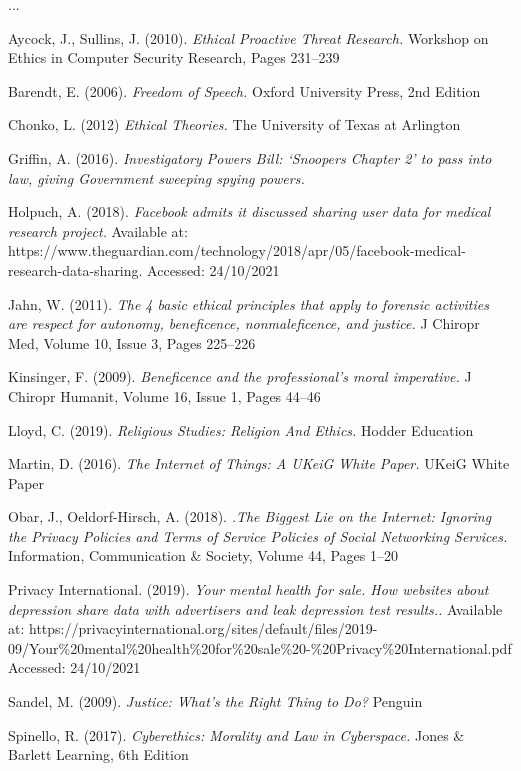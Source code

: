 \documentclass[11pt, english]{article}
\begin{document}
...

\newpage

\renewcommand\refname{Bibliography}

\begin{thebibliography}{9}

	\bibitem{}
		Aycock, J., Sullins, J. (2010).
                \textsl{Ethical Proactive Threat Research.}
		Workshop on Ethics in Computer Security Research, Pages 231--239

	\bibitem{}
		Barendt, E. (2006).
                \textsl{Freedom of Speech.}
		Oxford University Press, 2nd Edition 

        \bibitem{}
		Chonko, L. (2012)
                \textsl{Ethical Theories.}
		The University of Texas at Arlington

	\bibitem{}
		Griffin, A. (2016).
                \textsl{Investigatory Powers Bill: `Snoopers Chapter 2' to pass into law, giving Government sweeping spying powers.}

	\bibitem{}
		Holpuch, A. (2018).
                \textsl{Facebook admits it discussed sharing user data for medical research project.}
		Available at: https://www.theguardian.com/technology/2018/apr/05/facebook-medical-research-data-sharing.
		Accessed: 24/10/2021

	\bibitem{}
		Jahn, W. (2011).
                \textsl{The 4 basic ethical principles that apply to forensic activities are respect for autonomy, beneficence, nonmaleficence, and justice.}
		J Chiropr Med, Volume 10, Issue 3, Pages 225--226

	\bibitem{}
		Kinsinger, F. (2009).
                \textsl{Beneficence and the professional's moral imperative.}
		J Chiropr Humanit, Volume 16, Issue 1, Pages 44--46

	\bibitem{}
		Lloyd, C. (2019).
                \textsl{Religious Studies: Religion And Ethics.}
		Hodder Education

	\bibitem{}
		Martin, D. (2016).
                \textsl{The Internet of Things: A UKeiG White Paper.}
		UKeiG White Paper

	\bibitem{}
		Obar, J., Oeldorf-Hirsch, A. (2018).
                \textsl{.The Biggest Lie on the Internet: Ignoring the Privacy Policies and Terms of Service Policies of Social Networking Services.}
		Information, Communication \& Society, Volume 44, Pages 1--20

	\bibitem{}
		Privacy International. (2019).
                \textsl{Your mental health for sale. How websites about depression share data with advertisers and leak depression test results..}
		Available at: https://privacyinternational.org/sites/default/files/2019-09/Your\%20mental\%20health\%20for\%20sale\%20-\%20Privacy\%20International.pdf
		Accessed: 24/10/2021

	\bibitem{}
		Sandel, M. (2009).
                \textsl{Justice: What's the Right Thing to Do?}
		Penguin

	\bibitem{}
		Spinello, R. (2017).
                \textsl{Cyberethics: Morality and Law in Cyberspace.}
		Jones \& Barlett Learning, 6th Edition

\end{thebibliography}
\end{document}
